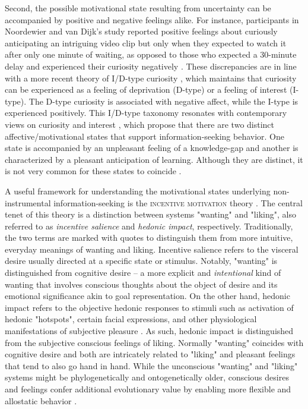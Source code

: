 Second, the possible motivational state resulting from uncertainty can be accompanied by positive and negative feelings alike. For instance, participants in Noordewier and van Dijk's study \cite{noordewier_curiosity_2017} reported positive feelings about curiously anticipating an intriguing video clip but only when they expected to watch it after only one minute of waiting, as opposed to those who expected a 30-minute delay and experienced their curiosity negatively \cite[but see][]{van_lieshout_curiosity_2020}. These discrepancies are in line with a more recent theory of I/D-type curiosity \cite{litman_curiosity_2019}, which maintains that curiosity can be experienced as a feeling of deprivation (D-type) or a feeling of interest (I-type). The D-type curiosity is associated with negative affect, while the I-type is experienced positively. This I/D-type taxonomy resonates with contemporary views on curiosity and interest \cite[e.g., ][]{hidi_interest_2019,shin_homo_2019,murayama_process_2019}, which propose that there are two distinct affective/motivational states that support information-seeking behavior. One state is accompanied by an unpleasant feeling of a knowledge-gap and another is characterized by a pleasant anticipation of learning. Although they are distinct, it is not very common for these states to coincide \cite{hidi_interest_2019}.

A useful framework for understanding the motivational states underlying non-instrumental information-seeking is the \textsc{incentive motivation} theory \cite{berridge_wanting_2009,robinson_roles_2016}. The central tenet of this theory is a distinction between systems "wanting" and "liking", also referred to as \emph{incentive salience} and \emph{hedonic impact}, respectively. Traditionally, the two terms are marked with quotes to distinguish them from more intuitive, everyday meanings of wanting and liking. Incentive salience refers to the visceral desire usually directed at a specific state or stimulus.  Notably, "wanting" is distinguished from cognitive desire -- a more explicit and \emph{intentional} kind of wanting that involves conscious thoughts about the object of desire and its emotional significance akin to goal representation. On the other hand, hedonic impact refers to the objective hedonic responses to stimuli such as activation of hedonic "hotspots", certain facial expressions, and other physiological manifestations of subjective pleasure \cite{berridge_pleasure_2015}. As such, hedonic impact is distinguished from the subjective conscious feelings of liking. Normally "wanting" coincides with cognitive desire and both are intricately related to "liking" and pleasant feelings that tend to also go hand in hand. While the unconscious "wanting" and "liking" systems might be phylogenetically and ontogenetically older, conscious desires and feelings confer additional evolutionary value by enabling more flexible and allostatic behavior \cite{damasio_nature_2013}.


